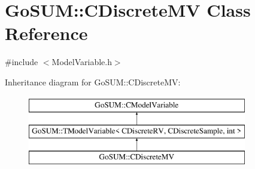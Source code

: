 \hypertarget{class_go_s_u_m_1_1_c_discrete_m_v}{\section{Go\-S\-U\-M\-:\-:C\-Discrete\-M\-V Class Reference}
\label{class_go_s_u_m_1_1_c_discrete_m_v}
}


{\ttfamily \#include $<$Model\-Variable.\-h$>$}

Inheritance diagram for Go\-S\-U\-M\-:\-:C\-Discrete\-M\-V\-:\begin{figure}[H]
\begin{center}
\leavevmode
\includegraphics[height=3.000000cm]{class_go_s_u_m_1_1_c_discrete_m_v}
\end{center}
\end{figure}
